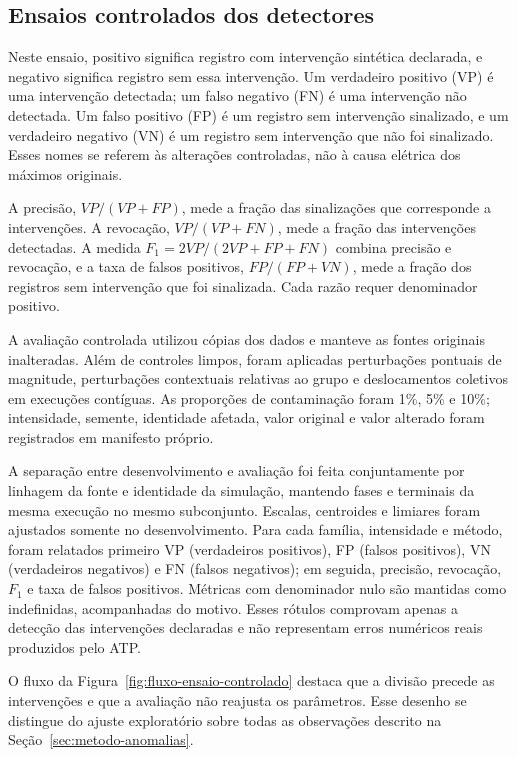 \documentclass[
	12pt,				%
	openright,			%
	oneside,			%
	a4paper,			%
	chapter=TITLE,		%
	section=TITLE,		%
	subsection=TITLE,	%
	subsubsection=TITLE,%
	english,			%
	brazilian			%
	]{abntex2}
\theoremstyle{definition}
\begin{document}
\subsection{Ensaios controlados dos detectores}

Neste ensaio, positivo significa registro com intervenção sintética
declarada, e negativo significa registro sem essa intervenção. Um verdadeiro
positivo (VP) é uma intervenção detectada; um falso negativo (FN) é uma
intervenção não detectada. Um falso positivo (FP) é um registro sem
intervenção sinalizado, e um verdadeiro negativo (VN) é um registro sem
intervenção que não foi sinalizado. Esses nomes se referem às alterações
controladas, não à causa elétrica dos máximos originais.

A precisão, $VP/(VP+FP)$, mede a fração das sinalizações que corresponde
a intervenções. A revocação, $VP/(VP+FN)$, mede a fração das intervenções
detectadas. A medida $F_1=2VP/(2VP+FP+FN)$ combina precisão e revocação,
e a taxa de falsos positivos, $FP/(FP+VN)$, mede a fração dos registros
sem intervenção que foi sinalizada. Cada razão requer denominador positivo.

A avaliação controlada utilizou cópias dos dados e manteve as fontes originais
inalteradas. Além de controles limpos, foram aplicadas perturbações pontuais de
magnitude, perturbações contextuais relativas ao grupo e deslocamentos
coletivos em execuções contíguas. As proporções de contaminação foram 1\%, 5\%
e 10\%; intensidade, semente, identidade afetada, valor original e valor
alterado foram registrados em manifesto próprio.

A separação entre desenvolvimento e avaliação foi feita conjuntamente por
linhagem da fonte e identidade da simulação, mantendo fases e terminais da
mesma execução no mesmo subconjunto. Escalas, centroides e limiares foram
ajustados somente no desenvolvimento. Para cada família, intensidade e
método, foram relatados primeiro VP (verdadeiros positivos), FP (falsos
positivos), VN (verdadeiros negativos) e FN (falsos negativos); em seguida, precisão, revocação,
$F_1$ e taxa de falsos positivos. Métricas com denominador nulo são mantidas
como indefinidas, acompanhadas do motivo. Esses rótulos comprovam apenas a
detecção das intervenções declaradas e não representam erros numéricos reais
produzidos pelo ATP.

O fluxo da Figura~\ref{fig:fluxo-ensaio-controlado} destaca que a divisão
precede as intervenções e que a avaliação não reajusta os parâmetros.
Esse desenho se distingue do ajuste exploratório sobre todas as
observações descrito na Seção~\ref{sec:metodo-anomalias}.
\end{document}
